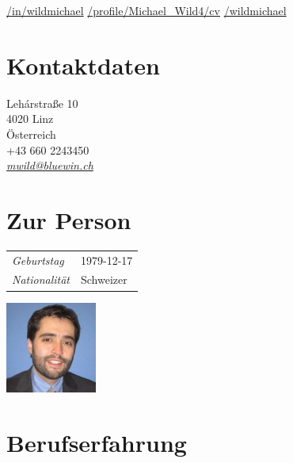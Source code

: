 \documentclass[line,11pt,a4paper]{../resume}
\newcommand{\mail}[1]{\textsl{\href{mailto:#1}{#1}}}
\begin{document}
\begin{resume}
\vspace{-4mm}
\-\hspace{-12.3mm}\begin{minipage}{15cm}
\href{https://linkedin.com/in/wildmichael}{\faLinkedinSquare/in/wildmichael}\quad
\href{https://xing.com/profile/Michael_Wild4/cv}{\faXingSquare/profile/Michael\_Wild4/cv}\quad
\href{https://github.com/wildmichael}{\faGithubSquare/wildmichael}
\end{minipage}


\begin{multicols}{3}

\section{\mysidestyle Kontaktdaten}\vspace{0.9mm}

Leh\'{a}rstra{\ss}e 10 \\
4020 Linz \\
Österreich \\
+43 660 2243450 \\
\mail{mwild@bluewin.ch}\\

\columnbreak

\section{\mysidestyle Zur Person}\vspace{2mm}

\begin{tabular}{@{}ll}
\textsl{Geburtstag} & 1979-12-17 \\
\textsl{Nationalität}   & Schweizer
\end{tabular}

\columnbreak
\vspace*{-9mm}\hfill\includegraphics[width=30mm]{../mwild}

\end{multicols}

\section{\mysidestyle Berufserfahrung}\vspace{2mm}


\end{resume}
\end{document}
